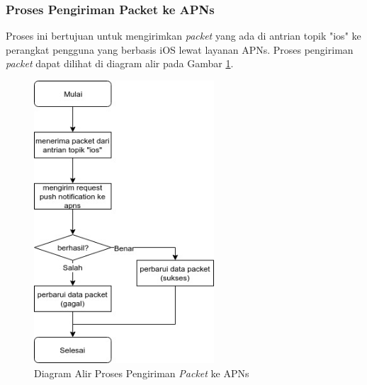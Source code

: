\subsubsection{Proses Pengiriman Packet ke APNs}
\par Proses ini bertujuan untuk mengirimkan \textit{packet} yang ada di antrian topik "ios" ke perangkat pengguna yang berbasis iOS lewat layanan APNs. Proses pengiriman \textit{packet} dapat dilihat di diagram alir pada
Gambar \ref{flowchart_pengiriman_packet_ke_apns}.
\begin{figure}[hb]
	\caption{Diagram Alir Proses Pengiriman \textit{Packet} ke APNs} \label{flowchart_pengiriman_packet_ke_apns}
    \centering\includegraphics[width=0.6\textwidth]{bab3/figures/flowchart_pengiriman_packet_ke_apns.jpg}
\end{figure}

